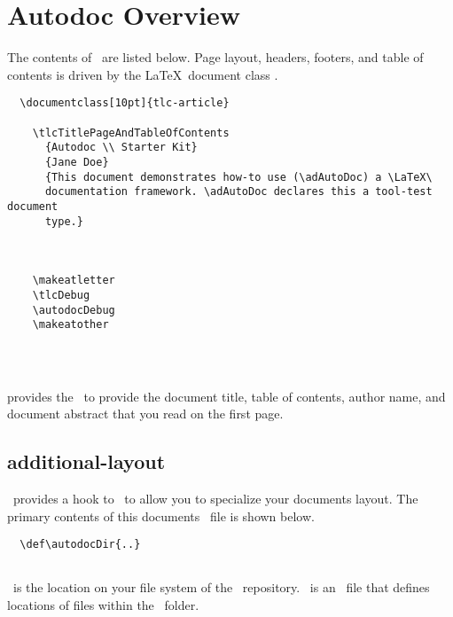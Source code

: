 
\section{Autodoc Overview}

%

The contents of \adStarterkit\ are listed below.  Page layout, headers, footers,
and table of contents is driven by the \LaTeX\ document class \adTlcArticle.

\begin{verbatim}
  \documentclass[10pt]{tlc-article}
  
    \tlcTitlePageAndTableOfContents
      {Autodoc \\ Starter Kit}
      {Jane Doe}
      {This document demonstrates how-to use (\adAutoDoc) a \LaTeX\
      documentation framework. \adAutoDoc declares this a tool-test document
      type.}

    

    \makeatletter
    \tlcDebug
    \autodocDebug
    \makeatother

  
\end{verbatim}

\subsection{\adToc}
\textbf{\adTlcArticle} provides the \adToc\ to provide the document title, table
of contents, author name, and document abstract that you read on the first page.

\subsection{additional-layout}
\adTlcArticle\  provides a hook to \adAdditionalLayout\ to allow you to specialize
your documents layout.  The primary contents of this documents
\adAdditionalLayout\ file is shown below.

\begin{verbatim}
  \def\autodocDir{..}
  
\end{verbatim}

\adAutoDocDir\ is the location on your file system of the \adAutoDoc\ repository.
\adProjectDirTex\ is an \adAutoDoc\ file that defines locations of files within
the \adAutoDoc\ folder.

